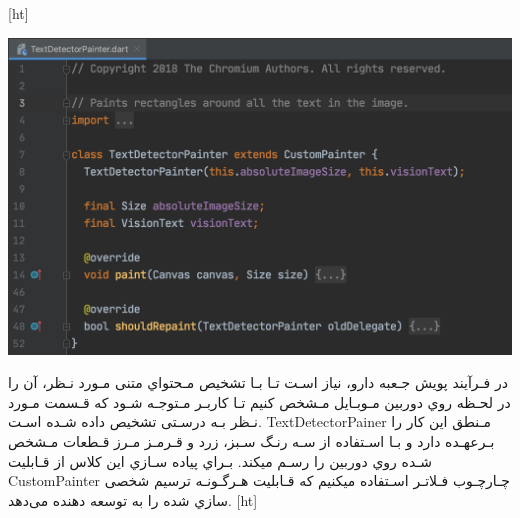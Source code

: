 [ht]
\begin{center}
\includegraphics[scale=0.7]{front/template/images/text-painter.png}
\end{center}
در فـرآیند پویش جـعبه دارو، نیاز اسـت تـا بـا تشخیص مـحتواي متنی مـورد نـظر، آن را در لحـظه روي دوربین مـوبـایل مـشخص کنیم تـا کاربـر مـتوجـه شـود که قـسمت مـورد نـظر بـه درسـتی تشخیص داده شـده اسـت. 
\newline
TextDetectorPainer مـنطق این کار را بـرعهـده دارد و بـا اسـتفاده از سـه رنـگ سـبز، زرد و قـرمـز مـرز قـطعات مـشخص شـده روي دوربین را رسـم میکند.
\newline
 بـراي پیاده سـازي این کلاس از قـابلیت CustomPainter چـارچـوب فـلاتـر اسـتفاده میکنیم که قـابلیت هـرگـونـه ترسیم شخصی سازي شده را به توسعه دهنده می‌دهد.
 \newline
{}[ht]
